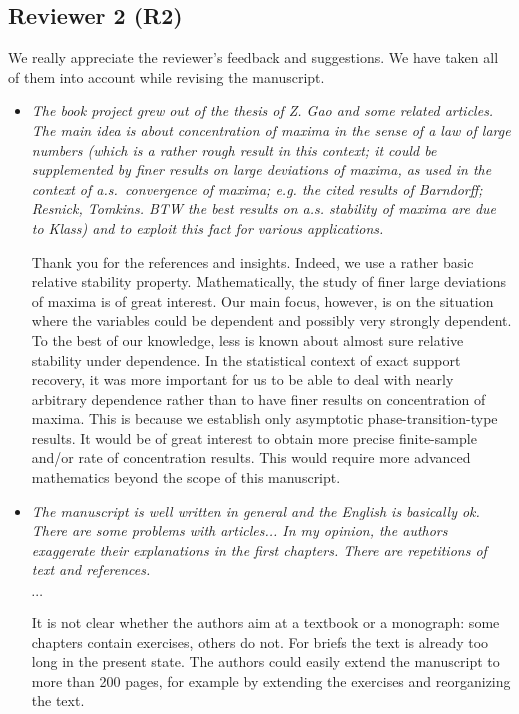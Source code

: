 \documentclass[11pt]{article}
\begin{document}
  \subsection{Reviewer 2 (R2)}
  
  We really appreciate the reviewer's feedback and suggestions.   We have taken all of them into account while revising the manuscript. 
  
   \begin{itemize}
   
     \item {\em The book project grew out of the thesis of Z. Gao and some related articles. The main idea is about concentration of maxima in the sense of a law of large numbers (which is a rather rough result in this context; it could be supplemented by finer results on large deviations of maxima, as used in the context of a.s.\ convergence of maxima; e.g. the cited results of Barndorff; Resnick, Tomkins. BTW the best results on a.s. stability of maxima are due to Klass) and to exploit this fact for various applications.
}
     
     Thank you for the references and insights.  
     Indeed, we use a rather basic relative stability property.  Mathematically, the study of finer large deviations of maxima is of great interest.  Our 
     main focus, however, is on the situation where the variables could be dependent and possibly very strongly dependent.  To the best of our knowledge, 
     less is known about almost sure relative stability under dependence.  In the statistical context of exact support recovery, it was more important for us 
     to be able to deal with nearly arbitrary dependence rather than to have finer results on concentration of maxima.  This is because we establish only
     asymptotic phase-transition-type results.  It would be of great interest to obtain more precise finite-sample 
     and/or rate of concentration results. This would require more advanced mathematics beyond the scope of this manuscript.
     
     \item {\em The manuscript is well written in general and the English is basically ok. There are some problems with articles... In my opinion, the authors exaggerate their explanations in the first chapters. There are repetitions of text and references.
     
     \centerline{$\cdots$}
     
     It is not clear whether the authors aim at a textbook or a monograph: some chapters contain exercises, others do not. For briefs the text is already too long in the present state. The authors could easily extend the manuscript to more than 200 pages, for example by extending the exercises and reorganizing the text.}
     

\end{itemize}
\end{document}
